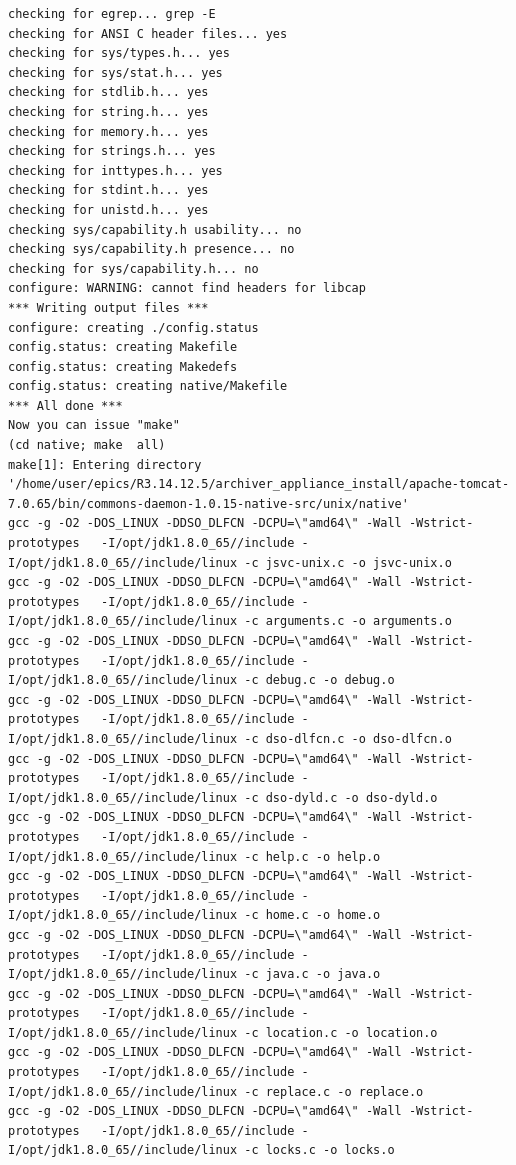 \documentclass[11pt
  , a4paper
  , article
  , oneside
]{memoir}
\begin{document}
\begin{lstlisting}[style=termstyle]
checking for egrep... grep -E
checking for ANSI C header files... yes
checking for sys/types.h... yes
checking for sys/stat.h... yes
checking for stdlib.h... yes
checking for string.h... yes
checking for memory.h... yes
checking for strings.h... yes
checking for inttypes.h... yes
checking for stdint.h... yes
checking for unistd.h... yes
checking sys/capability.h usability... no
checking sys/capability.h presence... no
checking for sys/capability.h... no
configure: WARNING: cannot find headers for libcap
*** Writing output files ***
configure: creating ./config.status
config.status: creating Makefile
config.status: creating Makedefs
config.status: creating native/Makefile
*** All done ***
Now you can issue "make"
(cd native; make  all)
make[1]: Entering directory '/home/user/epics/R3.14.12.5/archiver_appliance_install/apache-tomcat-7.0.65/bin/commons-daemon-1.0.15-native-src/unix/native'
gcc -g -O2 -DOS_LINUX -DDSO_DLFCN -DCPU=\"amd64\" -Wall -Wstrict-prototypes   -I/opt/jdk1.8.0_65//include -I/opt/jdk1.8.0_65//include/linux -c jsvc-unix.c -o jsvc-unix.o
gcc -g -O2 -DOS_LINUX -DDSO_DLFCN -DCPU=\"amd64\" -Wall -Wstrict-prototypes   -I/opt/jdk1.8.0_65//include -I/opt/jdk1.8.0_65//include/linux -c arguments.c -o arguments.o
gcc -g -O2 -DOS_LINUX -DDSO_DLFCN -DCPU=\"amd64\" -Wall -Wstrict-prototypes   -I/opt/jdk1.8.0_65//include -I/opt/jdk1.8.0_65//include/linux -c debug.c -o debug.o
gcc -g -O2 -DOS_LINUX -DDSO_DLFCN -DCPU=\"amd64\" -Wall -Wstrict-prototypes   -I/opt/jdk1.8.0_65//include -I/opt/jdk1.8.0_65//include/linux -c dso-dlfcn.c -o dso-dlfcn.o
gcc -g -O2 -DOS_LINUX -DDSO_DLFCN -DCPU=\"amd64\" -Wall -Wstrict-prototypes   -I/opt/jdk1.8.0_65//include -I/opt/jdk1.8.0_65//include/linux -c dso-dyld.c -o dso-dyld.o
gcc -g -O2 -DOS_LINUX -DDSO_DLFCN -DCPU=\"amd64\" -Wall -Wstrict-prototypes   -I/opt/jdk1.8.0_65//include -I/opt/jdk1.8.0_65//include/linux -c help.c -o help.o
gcc -g -O2 -DOS_LINUX -DDSO_DLFCN -DCPU=\"amd64\" -Wall -Wstrict-prototypes   -I/opt/jdk1.8.0_65//include -I/opt/jdk1.8.0_65//include/linux -c home.c -o home.o
gcc -g -O2 -DOS_LINUX -DDSO_DLFCN -DCPU=\"amd64\" -Wall -Wstrict-prototypes   -I/opt/jdk1.8.0_65//include -I/opt/jdk1.8.0_65//include/linux -c java.c -o java.o
gcc -g -O2 -DOS_LINUX -DDSO_DLFCN -DCPU=\"amd64\" -Wall -Wstrict-prototypes   -I/opt/jdk1.8.0_65//include -I/opt/jdk1.8.0_65//include/linux -c location.c -o location.o
gcc -g -O2 -DOS_LINUX -DDSO_DLFCN -DCPU=\"amd64\" -Wall -Wstrict-prototypes   -I/opt/jdk1.8.0_65//include -I/opt/jdk1.8.0_65//include/linux -c replace.c -o replace.o
gcc -g -O2 -DOS_LINUX -DDSO_DLFCN -DCPU=\"amd64\" -Wall -Wstrict-prototypes   -I/opt/jdk1.8.0_65//include -I/opt/jdk1.8.0_65//include/linux -c locks.c -o locks.o

\end{lstlisting}
\end{document}
